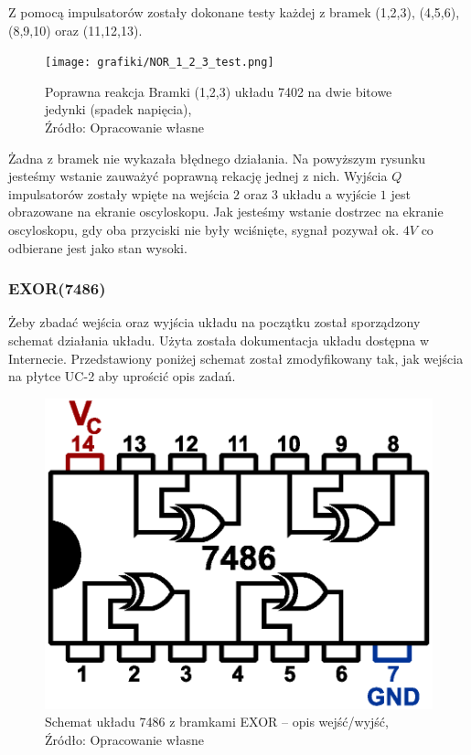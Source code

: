 \documentclass{article}
\begin{document}
        Z pomocą impulsatorów zostały dokonane testy każdej z bramek (1,2,3), (4,5,6), (8,9,10) oraz (11,12,13).

        \begin{figure}[!ht]
          \centering
          \texttt{[image: grafiki/NOR\_1\_2\_3\_test.png]}
          \caption{Poprawna reakcja Bramki (1,2,3) układu 7402 na dwie bitowe jedynki (spadek napięcia),
          \\Źródło: Opracowanie własne}
        \end{figure}
        Żadna z bramek nie wykazała błędnego działania. Na powyższym rysunku jesteśmy wstanie zauważyć poprawną rekację jednej z nich. Wyjścia $Q$ impulsatorów zostały wpięte na wejścia $2$ oraz $3$ układu a wyjście $1$ jest obrazowane na ekranie oscyloskopu. Jak jesteśmy wstanie dostrzec na ekranie oscyloskopu, gdy oba przyciski nie były wciśnięte, sygnał pozywał ok. $4V$ co odbierane jest jako stan wysoki.

      \subsubsection{EXOR(7486)}
        Żeby zbadać wejścia oraz wyjścia układu na początku został sporządzony schemat działania układu. Użyta została dokumentacja układu dostępna w Internecie. Przedstawiony poniżej schemat został zmodyfikowany tak, jak wejścia na płytce UC-2 aby uprościć opis zadań.

        \begin{figure}[!ht]
            \centering
            \includegraphics[scale=0.45]{grafiki/TTL_EXOR_7486.eps}
            \caption{Schemat układu 7486 z bramkami EXOR -- opis wejść/wyjść,
            \\Źródło: Opracowanie własne}
        \end{figure}
\end{document}
